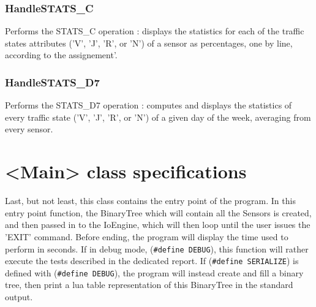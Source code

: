 \documentclass[10pt]{article}
\begin{document}
\subsubsection*{HandleSTATS\_C}
Performs the STATS\_C operation : displays the statistics for each of the traffic states attributes ('V', 'J', 'R', or 'N') of a sensor as percentages, one by line, according to the assignement\footnotemark[2]'\footnotemark[3].

\subsubsection*{HandleSTATS\_D7}
Performs the STATS\_D7 operation : computes and displays the statistics of every traffic state ('V', 'J', 'R', or 'N') of a given day of the week, averaging from every sensor\footnotemark[2].

\section{<Main> class specifications}
Last, but not least, this class contains the entry point of the program. In this entry point function, the BinaryTree which will contain all the Sensors is created, and then passed in to the IoEngine, which will then loop until the user issues the 'EXIT' command. Before ending, the program will display the time used to perform in seconds.
If in debug mode, (\texttt{\#define DEBUG}), this function will rather execute the tests described in the dedicated report. If (\texttt{\#define SERIALIZE}) is defined with  (\texttt{\#define DEBUG}), the program will instead create and fill a binary tree, then print a lua table representation of this BinaryTree in the standard output.
\end{document}
